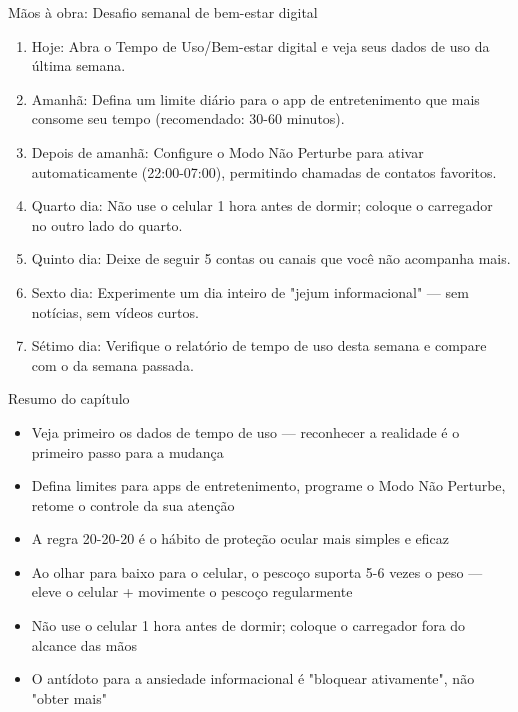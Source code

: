 \begin{tcbpractice}{Mãos à obra: Desafio semanal de bem-estar digital}
\begin{enumerate}
  \item Hoje: Abra o Tempo de Uso/Bem-estar digital e veja seus dados de uso da última semana.
  \item Amanhã: Defina um limite diário para o app de entretenimento que mais consome seu tempo (recomendado: 30-60 minutos).
  \item Depois de amanhã: Configure o Modo Não Perturbe para ativar automaticamente (22:00-07:00), permitindo chamadas de contatos favoritos.
  \item Quarto dia: Não use o celular 1 hora antes de dormir; coloque o carregador no outro lado do quarto.
  \item Quinto dia: Deixe de seguir 5 contas ou canais que você não acompanha mais.
  \item Sexto dia: Experimente um dia inteiro de "jejum informacional" — sem notícias, sem vídeos curtos.
  \item Sétimo dia: Verifique o relatório de tempo de uso desta semana e compare com o da semana passada.
\end{enumerate}

\end{tcbpractice}

\begin{tcbsummary}{Resumo do capítulo}
\begin{itemize}
  \item Veja primeiro os dados de tempo de uso — reconhecer a realidade é o primeiro passo para a mudança
  \item Defina limites para apps de entretenimento, programe o Modo Não Perturbe, retome o controle da sua atenção
  \item A regra 20-20-20 é o hábito de proteção ocular mais simples e eficaz
  \item Ao olhar para baixo para o celular, o pescoço suporta 5-6 vezes o peso — eleve o celular + movimente o pescoço regularmente
  \item Não use o celular 1 hora antes de dormir; coloque o carregador fora do alcance das mãos
  \item O antídoto para a ansiedade informacional é "bloquear ativamente", não "obter mais"
\end{itemize}

\end{tcbsummary}
